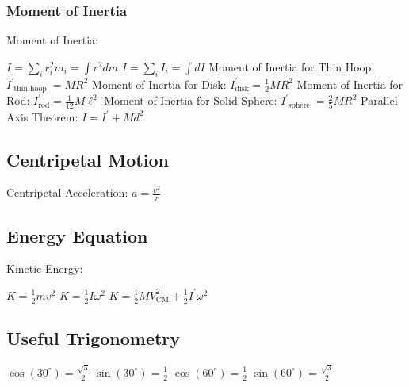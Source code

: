 \documentclass[../main.tex]{subfiles}
\begin{document}
\subsubsection{Moment of Inertia}
Moment of Inertia: \hfill \par
$I=\sum_{i} r_{i}^{2} m_{i}=\int r^{2} d m$ \hspace{10mm}
$I=\sum_{i} I_{i}=\int d I$ \hfill \break
Moment of Inertia for Thin Hoop: $I_{\text { thin hoop }}^{\prime}=M R^{2}$ \hfill \break
Moment of Inertia for Disk: $I_{\mathrm{disk}}^{\prime}=\frac{1}{2} M R^{2}$ \hfill \break
Moment of Inertia for Rod: $I_{\mathrm{rod}}^{\prime}=\frac{1}{12} M \ell^{2}$ \hfill \break
Moment of Inertia for Solid Sphere: $I_{\text { sphere }}^{\prime}=\frac{2}{5} M R^{2}$ \hfill \break
Parallel Axis Theorem: $I=I^{\prime}+M d^{2}$ \hfill \break

\subsection{Centripetal Motion}
Centripetal Acceleration: $a = \frac{{\upsilon ^2 }}{r}$ \hfill \break

\subsection{Energy Equation}
Kinetic Energy: \hfill \par
$K  = \frac{1}{2}mv^2$  \hspace{10mm} 
$K=\frac{1}{2} I \omega^{2}$ 
\hspace{10mm} 
$K=\frac{1}{2} M V_{\mathrm{CM}}^{2}+\frac{1}{2} I^{\prime} \omega^{2}$ \hfill \break

\subsection{Useful Trigonometry}
$\cos \left(30^{\circ}\right)=\frac{\sqrt{3}}{2}$ \hspace{10mm}
$\sin \left(30^{\circ}\right)=\frac{1}{2}$ \hspace{10mm}
$\cos \left(60^{\circ}\right)=\frac{1}{2}$ \hspace{10mm}
$\sin \left(60^{\circ}\right)=\frac{\sqrt{3}}{2}$ \hspace{10mm}

\break
\newline
\end{document}

